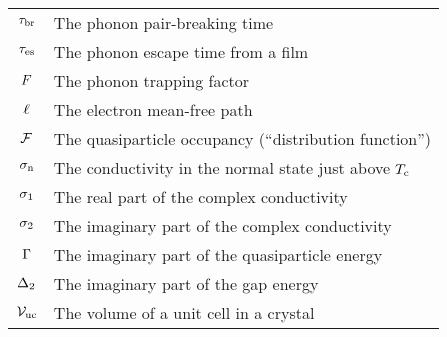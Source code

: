 \begin{table}[tb]
\begin{tabular}{c l}
$\tau_\mathrm{br}$ & The phonon pair-breaking time \\
$\tau_\mathrm{es}$ & The phonon escape time from a film \\
$F$ & The phonon trapping factor \\
$\ell$ & The electron mean-free path \\
$\mathcal{F}$ & The quasiparticle occupancy (``distribution function'') \\
$\sigma_{\mathrm{n}}$ & The conductivity in the normal state just above $T_{\mathrm{c}}$ \\
$\sigma_1$ & The real part of the complex conductivity \\
$\sigma_2$ & The imaginary part of the complex conductivity \\
$\Gamma$ & The imaginary part of the quasiparticle energy \\
$\Delta_2$ & The imaginary part of the gap energy \\
$\mathcal{V}_\mathrm{uc}$ & The volume of a unit cell in a crystal \\
\bottomrule
\end{tabular}
\label{tab:notation.condensed_matter}
\end{table}

\newcommand{\shift}{s}
\newcommand{\ssshift}{\overline{\shift}}
\newcommand{\detuning}{x}
\newcommand{\ssdetuning}{\overline{\detuning}}
\newcommand{\loss}{\Lambda}
\newcommand{\ssloss}{\overline{\loss}}
\newcommand{\qf}{Q}
\newcommand{\asymmetry}{A}
\newcommand{\surfimpexp}{\zeta}
\newcommand{\kifraction}{\alpha}
\newcommand{\qpfraction}{\chi_\quasiparticle}
\newcommand{\restransfer}{\xi_\resonator}
\newcommand{\pbefficiency}{\efficiency_\mathrm{pb}}
\newcommand{\qpperphoton}{q}
\newcommand{\adiabatici}{\Sigma_{\loss_\internal}}
\newcommand{\adiabaticx}{\Sigma_\detuning}

